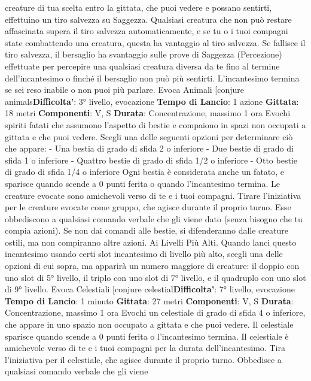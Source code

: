 \begin{multicols}{2}
creature di tua scelta entro la gittata, che puoi vedere e
possano sentirti, effettuino un tiro salvezza su
Saggezza. Qualsiasi creatura che non può restare
affascinata supera il tiro salvezza automaticamente, e
se tu o i tuoi compagni state combattendo una creatura,
questa ha vantaggio al tiro salvezza. Se fallisce il tiro
salvezza, il bersaglio ha svantaggio sulle prove di
Saggezza (Percezione) effettuate per percepire una
qualsiasi creatura diversa da te fino al termine
dell’incantesimo o finché il bersaglio non può più
sentirti. L’incantesimo termina se sei reso inabile o non
puoi più parlare.
Evoca Animali
[conjure animals\textbf{Difficolta'}:
3° livello, evocazione
\textbf{Tempo di Lancio}: 1 azione
\textbf{Gittata}: 18 metri
\textbf{Componenti}: V, S
\textbf{Durata}: Concentrazione, massimo 1 ora
Evochi spiriti fatati che assumono l’aspetto di bestie e
compaiono in spazi non occupati a gittata e che puoi
vedere. Scegli una delle seguenti opzioni per
determinare ciò che appare:
- Una bestia di grado di sfida 2 o inferiore
- Due bestie di grado di sfida 1 o inferiore
- Quattro bestie di grado di sfida 1/2 o inferiore
- Otto bestie di grado di sfida 1/4 o inferiore
Ogni bestia è considerata anche un fatato, e sparisce
quando scende a 0 punti ferita o quando l’incantesimo
termina.
Le creature evocate sono amichevoli verso di te e i tuoi
compagni. Tirare l’iniziativa per le creature evocate
come gruppo, che agisce durante il proprio turno. Esse
obbediscono a qualsiasi comando verbale che gli viene
dato (senza bisogno che tu compia azioni). Se non dai
comandi alle bestie, si difenderanno dalle creature
ostili, ma non compiranno altre azioni.
Ai Livelli Più Alti. Quando lanci questo incantesimo
usando certi slot incantesimo di livello più alto, scegli
una delle opzioni di cui sopra, ma apparirà un numero
maggiore di creature: il doppio con uno slot di 5° livello,
il triplo con uno slot di 7° livello, e il quadruplo con uno
slot di 9° livello.
Evoca Celestiali
[conjure celestial\textbf{Difficolta'}:
7° livello, evocazione
\textbf{Tempo di Lancio}: 1 minuto
\textbf{Gittata}: 27 metri
\textbf{Componenti}: V, S
\textbf{Durata}: Concentrazione, massimo 1 ora
Evochi un celestiale di grado di sfida 4 o inferiore, che
appare in uno spazio non occupato a gittata e che puoi
vedere. Il celestiale sparisce quando scende a 0 punti
ferita o l’incantesimo termina.
Il celestiale è amichevole verso di te e i tuoi compagni
per la durata dell’incantesimo. Tira l’iniziativa per il
celestiale, che agisce durante il proprio turno.
Obbedisce a qualsiasi comando verbale che gli viene

\end{multicols}
